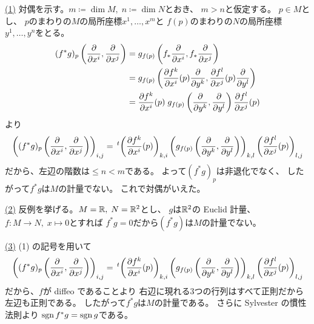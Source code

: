 \documentclass[report]{jlreq}
\begin{document}
\begin{answer}
    \uline{(1)} \quad
    対偶を示す。$m \coloneqq \dim M, \; n \coloneqq \dim N$とおき、
    $m > n$と仮定する。
    $p \in M$とし、
    $p$のまわりの$M$の局所座標$x^1, \dots, x^m$と
    $f(p)$のまわりの$N$の局所座標$y^1, \dots, y^n$をとる。
    \begin{alignat}{1}
        (f^* g)_p \left(
            \deldel{x^i}, \deldel{x^j}
        \right)
            &= g_{f(p)} \left(
                f_* \deldel{x^i}, f_* \deldel{x^j}
            \right) \\
            &= g_{f(p)} \left(
                \deldel[f^k]{x^i}(p) \deldel{y^k},
                \deldel[f^l]{x^j}(p) \deldel{y^l}
            \right) \\
            &= \deldel[f^k]{x^i}(p) \;
                g_{f(p)} \left(
                    \deldel{y^k}, \deldel{y^l}
                \right)
                \deldel[f^l]{x^j}(p)
    \end{alignat}
    より
    \begin{equation}
        \left(
            (f^* g)_p \left(
                \deldel{x^i}, \deldel{x^j}
            \right)
        \right)_{i, j}
            = \up{t} \left(
                \deldel[f^k]{x^i}(p)
            \right)_{k, i}
            \left(
                g_{f(p)} \left(
                    \deldel{y^k}, \deldel{y^l}
                \right)
            \right)_{k, l}
            \left(
                \deldel[f^l]{x^j}(p)
            \right)_{l, j}
    \end{equation}
    だから、左辺の階数は$\le n < m$である。
    よって$(f^* g)_p$は非退化でなく、
    したがって$f^* g$は$M$の計量でない。
    これで対偶がいえた。

    \uline{(2)} \quad
    反例を挙げる。$M = \mathbb{R}, \; N = \mathbb{R}^2$とし、
    $g$は$\mathbb{R}^2$の Euclid 計量、
    $f \colon M \to N, \; x \mapsto 0$とすれば
    $f^* g = 0$だから$(f^* g)$は$M$の計量でない。

    \uline{(3)} \quad
    (1) の記号を用いて
    \begin{equation}
        \left(
            (f^* g)_p \left(
                \deldel{x^i}, \deldel{x^j}
            \right)
        \right)_{i, j}
            = \up{t} \left(
                \deldel[f^k]{x^i}(p)
            \right)_{k, i}
            \left(
                g_{f(p)} \left(
                    \deldel{y^k}, \deldel{y^l}
                \right)
            \right)_{k, l}
            \left(
                \deldel[f^l]{x^j}(p)
            \right)_{l, j}
    \end{equation}
    だから、$f$が diffeo であることより
    右辺に現れる3つの行列はすべて正則だから
    左辺も正則である。
    したがって$f^* g$は$M$の計量である。
    さらに Sylvester の慣性法則より
    $\operatorname{sgn} f^* g = \operatorname{sgn} g$である。
\end{answer}
\end{document}
